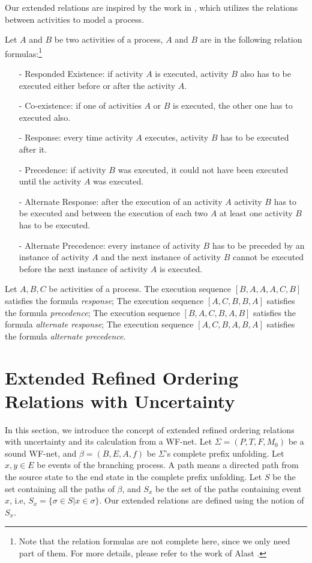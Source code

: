 \documentclass{llncs}
\begin{document}
Our extended relations are inspired by the work in \cite{van2006decserflow}, which utilizes the relations between activities to model a process.
\begin{definition}\label{def:relationFormulas}
Let $A$ and $B$ be two activities of a process, $A$ and $B$ are in the following relation formulas:\footnote{Note that the relation formulas are not complete here, since we only need part of them. For more details, please refer to the work of Alast \cite{van2006decserflow}.}
	\begin{itemize}
		\item[-] Responded Existence: if activity $A$ is executed, activity $B$ also has to be executed either before or after the activity $A$.
		\item[-] Co-existence: if one of activities $A$ or $B$ is executed, the other one has to executed also.
		\item[-] Response: every time activity $A$ executes, activity $B$ has to be executed after it.
		\item[-] Precedence: if activity $B$ was executed, it could not have been executed until the activity $A$ was executed.
		\item[-] Alternate Response: after the execution of an activity $A$ activity $B$ has to be executed and between the execution of each two $A$ at least one activity $B$ has to be executed.
		\item[-] Alternate Precedence: every instance of activity $B$ has to be preceded by an instance of activity $A$ and the next instance of activity $B$ cannot be executed before the next instance of activity $A$ is executed.
	\end{itemize}
\end{definition}

\begin{example}\label{ex:relationFormulas}
Let $A,B,C$ be activities of a process. The execution sequence $[B,A,A,A,C,B]$ satisfies the formula \textit{response}; The execution sequence $[A,C,B,B,A]$ satisfies the formula \textit{precedence}; The execution sequence $[B,A,C,B,A,B]$ satisfies the formula \textit{alternate response}; The execution sequence $[A,C,B,A,B,A]$ satisfies the formula \textit{alternate precedence}.
\end{example}

\section{Extended Refined Ordering Relations with Uncertainty}\label{sec:relations}
In this section, we introduce the concept of extended refined ordering relations with uncertainty and its calculation from a WF-net. Let $\Sigma=(P,T,F,M_{0})$ be a sound WF-net, and $\beta=(B,E,A,f)$ be $\Sigma$'s complete prefix unfolding. Let $x,y\in E$ be events of the branching process. A path means a directed path from the source state to the end state in the complete prefix unfolding. Let $S$ be the set containing all the paths of $\beta$, and $S_{x}$ be the set of the paths containing event $x$, i.e, $S_{x}=\{\sigma\in S|x\in\sigma\}$. Our extended relations are defined using the notion of $S_{x}$.
\end{document}
